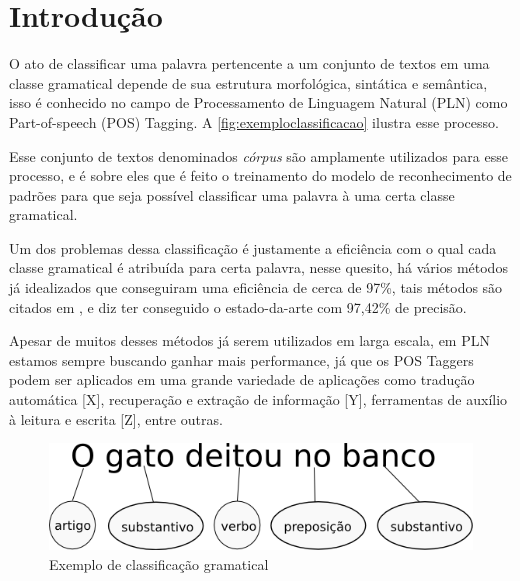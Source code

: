 \chapter{Introdução}\label{introducao}

O ato de classificar uma palavra pertencente a um conjunto de textos em uma classe gramatical depende de sua estrutura morfológica, sintática e semântica, isso é conhecido no campo de Processamento de Linguagem Natural (PLN) como Part-of-speech (POS) Tagging. A \autoref{fig:exemploclassificacao} ilustra esse processo. 

Esse conjunto de textos denominados \textit{córpus} são amplamente utilizados para esse processo, e é sobre eles que é feito o treinamento do modelo de reconhecimento de padrões para que seja possível classificar uma palavra à uma certa classe gramatical.

Um dos problemas dessa classificação é justamente a eficiência com o qual cada classe gramatical é atribuída para certa palavra, nesse quesito, há vários métodos já idealizados que conseguiram uma eficiência de cerca de 97\%, tais métodos são citados em \cite{dos2014training}, e \cite{fonseca2015evaluating} diz ter conseguido o estado-da-arte com 97,42\% de precisão.

Apesar de muitos desses métodos já serem utilizados em larga escala, em PLN estamos sempre buscando ganhar mais performance, já que os POS Taggers podem ser aplicados em uma grande variedade de aplicações como tradução automática [X], recuperação e extração de informação [Y], ferramentas de auxílio à leitura e escrita [Z], entre outras.

\begin{figure}[htb]
  \caption{Exemplo de classificação gramatical}\label{fig:exemploclassificacao}
  \begin{center}
      \includegraphics[scale=0.5]{img/exemplo_classificacao}
  \end{center}
\end{figure}

